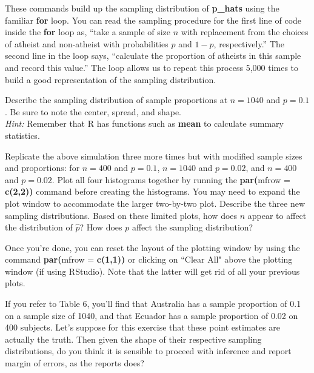 \documentclass{article}\usepackage[]{graphicx}\usepackage[]{color}
\newcommand{\hlkwc}[1]{\textcolor[rgb]{0.333,0.667,0.333}{#1}}%
\newcommand{\hlkwd}[1]{\textcolor[rgb]{0.737,0.353,0.396}{\textbf{#1}}}%
\begin{document}
These commands build up the sampling distribution of \hlkwd{p\_hats} using the familiar \hlkwd{for} loop. You can read the sampling procedure for the first line of code inside the \hlkwd{for} loop as, ``take a sample of size $n$ with replacement from the choices of atheist and non-atheist with probabilities $p$ and $1 - p$, respectively.'' The second line in the loop says, ``calculate the proportion of atheists in this sample and record this value.'' The loop allows us to repeat this process 5,000 times to build a good representation of the sampling distribution.

\begin{exercise}
Describe the sampling distribution of sample proportions at $n = 1040$ and $p = 0.1$. Be sure to note the center, spread, and shape. \\
\textit{Hint:} Remember that R has functions such as \hlkwd{mean} to calculate summary statistics.
\end{exercise}

\begin{exercise}
Replicate the above simulation three more times but with modified sample sizes and proportions: for $n = 400$ and $p = 0.1$, $n = 1040$ and $p = 0.02$, and $n = 400$ and $p = 0.02$. Plot all four histograms together by running the \hlkwd{par(}\hlkwc{mfrow = }\hlkwd{c(}\hlkwd{2,2}\hlkwd{))} command before creating the histograms. You may need to expand the plot window to accommodate the larger two-by-two plot. Describe the three new sampling distributions. Based on these limited plots, how does $n$ appear to affect the distribution of $\hat{p}$? How does $p$ affect the sampling distribution?
\end{exercise}

Once you're done, you can reset the layout of the plotting window by using the command \hlkwd{par(}\hlkwc{mfrow = }\hlkwd{c(}\hlkwd{1,1}\hlkwd{))} or clicking on ``Clear All" above the plotting window (if using RStudio). Note that the latter will get rid of all your previous plots.

\begin{exercise}
If you refer to Table 6,  you'll find that Australia has a sample proportion of 0.1 on a sample size of 1040, and that Ecuador has a sample proportion of 0.02 on 400 subjects. Let's suppose for this exercise that these point estimates are actually the truth. Then given the shape of their respective sampling distributions, do you think it is sensible to proceed with inference and report margin of errors, as the reports does?
\end{exercise}
\end{document}
